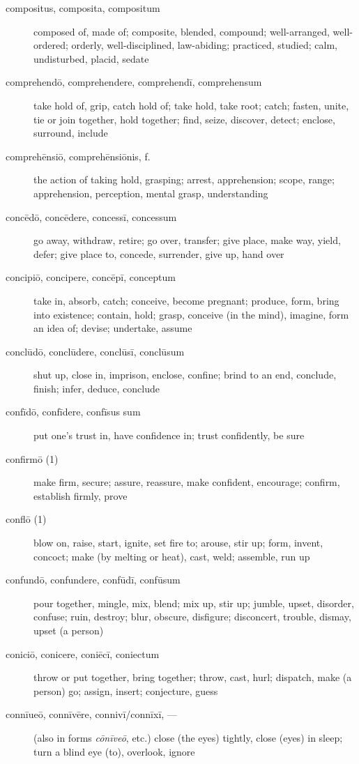 \begin{description}
    \item[compositus, composita, compositum] composed of, made of; composite, blended, compound; well-arranged, well-ordered; orderly, well-disciplined, law-abiding; practiced, studied; calm, undisturbed, placid, sedate
    \item[comprehendō, comprehendere, comprehendī, comprehensum] take hold of, grip, catch hold of; take hold, take root; catch; fasten, unite, tie or join together, hold together; find, seize, discover, detect; enclose, surround, include
    \item[comprehēnsiō, comprehēnsiōnis, f.] the action of taking hold, grasping; arrest, apprehension; scope, range; apprehension, perception, mental grasp, understanding
    \item[concēdō, concēdere, concessī, concessum] go away, withdraw, retire; go over, transfer; give place, make way, yield, defer; give place to, concede, surrender, give up, hand over
    \item[concipiō, concipere, concēpī, conceptum] take in, absorb, catch; conceive, become pregnant; produce, form, bring into existence; contain, hold; grasp, conceive (in the mind), imagine, form an idea of; devise; undertake, assume
    \item[conclūdō, conclūdere, conclūsī, conclūsum] shut up, close in, imprison, enclose, confine; brind to an end, conclude, finish; infer, deduce, conclude
    \item[confīdō, confīdere, confīsus sum] put one's trust in, have confidence in; trust confidently, be sure
    \item[confirmō (1)] make firm, secure; assure, reassure, make confident, encourage; confirm, establish firmly, prove
    \item[conflō (1)] blow on, raise, start, ignite, set fire to; arouse, stir up; form, invent, concoct; make (by melting or heat), cast, weld; assemble, run up
    \item[confundō, confundere, confūdī, confūsum] pour together, mingle, mix, blend; mix up, stir up; jumble, upset, disorder, confuse; ruin, destroy; blur, obscure, disfigure; disconcert, trouble, dismay, upset (a person)
    \item[coniciō, conicere, coniēcī, coniectum] throw or put together, bring together; throw, cast, hurl; dispatch, make (a person) go; assign, insert; conjecture, guess
    \item[connīueō, connīvēre, connivī/connīxī, ---] (also in forms \textit{cōnīveō}, etc.) close (the eyes) tightly, close (eyes) in sleep; turn a blind eye (to), overlook, ignore

\end{description}
